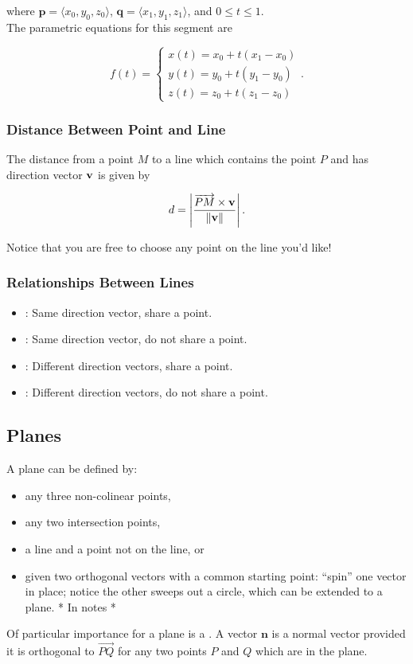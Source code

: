 where \(\mathbf{p} = \langle x_{0},y_{0},z_{0} \rangle\), \(\mathbf{q} = \langle x_{1},y_{1},z_{1} \rangle\), and \(0 \leq t \leq 1\). \\

The parametric equations for this segment are 

\[
    f(t) = \begin{cases}
        x(t) = x_{0} + t(x_{1} - x_{0}) \\
        y(t) = y_{0} + t(y_{1} - y_{0}) \\
        z(t) = z_{0} + t(z_{1} - z_{0})
    \end{cases}.
\]

\subsubsection{Distance Between Point and Line}

The distance from a point \(M\) to a line which contains the point \(P\) and has direction vector \(\mathbf{v}\) is given by

\[
    d = \left| \frac{\overrightarrow{PM} \times \mathbf{v}}{\left\lVert \mathbf{v}\right\rVert} \right|.
\]

Notice that you are free to choose any point on the line you'd like!

\subsubsection{Relationships Between Lines}

\begin{itemize}
    \item {}: Same direction vector, share a point.
    \item {}: Same direction vector, do not share a point.
    \item {}: Different direction vectors, share a point.
    \item {}: Different direction vectors, do not share a point.
\end{itemize}

\subsection{Planes}
A plane can be defined by:
\begin{itemize}
    \item any three non-colinear points,
    \item any two intersection points,
    \item a line and a point not on the line, or
    \item given two orthogonal vectors with a common starting point: ``spin''  one vector in place; notice the other sweeps out a circle, which can be extended to a plane. * In notes *
\end{itemize}
Of particular importance for a plane is a . A vector \(\mathbf{n}\) is a normal vector provided it is orthogonal to \(\overrightarrow{PQ}\) for any two points \(P\) and \(Q\) which are in the plane.

